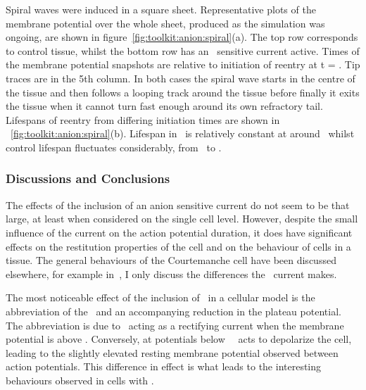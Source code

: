Spiral waves were induced in a square sheet.
Representative plots of the
membrane potential over the whole sheet, produced as the simulation was ongoing,
are shown in figure~\ref{fig:toolkit:anion:spiral}(a).
The top row corresponds to control tissue, whilst the bottom row has an
\ sensitive current active.
Times of the membrane potential snapshots are relative to initiation of reentry at t = .
Tip traces are in the 5th column.
In both cases the spiral wave starts in the centre of the tissue and then follows a
looping track around the tissue before finally it exits the tissue when it
cannot turn fast enough around its own refractory tail.
Lifespans of reentry from differing initiation times are shown in
~\ref{fig:toolkit:anion:spiral}(b).
Lifespan in \ is relatively constant at around \ whilst
control lifespan fluctuates considerably, from \ to .

\subsubsection{Discussions and Conclusions}

The effects of the inclusion of an anion sensitive current do not seem to be
that large, at least when considered on the single cell level.
However, despite the small influence of the current on the action potential duration,
it does have significant effects on the restitution properties of the cell and
on the behaviour of cells in a tissue.
The general behaviours of the Courtemanche cell have been discussed elsewhere,
for example in~\cite{CRN98,Cherry2008a}, I only discuss the differences the
\ current makes.

The most noticeable effect of the inclusion of \ in a cellular model
is the abbreviation of the \apd[50]\ and an accompanying reduction in the
plateau potential.  The abbreviation is due to \ acting as a
rectifying current when the membrane potential is above .   Conversely,
at potentials below \ \ acts to depolarize the cell, leading
to the slightly elevated resting membrane potential observed between action
potentials.  This difference in effect is what leads to the interesting
behaviours observed in cells with .

